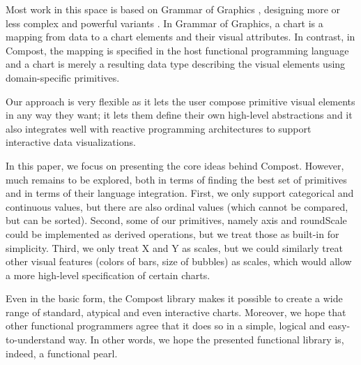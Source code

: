 \documentclass{jfp}
\newcommand{\kvd}[1]{\textnormal{\textcolor{kvdclr}{\sffamily #1}}}
\begin{document}
Most work in this space is based on Grammar of Graphics \cite{grammar}, designing more or less complex and
powerful variants \cite{layered,vega-lite,vega,polaris}. In Grammar of Graphics, a chart is a mapping from
data to a chart elements and their visual attributes. In contrast, in Compost, the mapping is
specified in the host functional programming language and a chart is merely a resulting data type
describing the visual elements using domain-specific primitives.

Our approach is very flexible as it lets the user compose primitive visual elements in any
way they want; it lets them define their own high-level abstractions and it also integrates well
with reactive programming architectures to support interactive data visualizations.

In this paper, we focus on presenting the core ideas behind Compost. However, much
remains to be explored, both in terms of finding the best set of primitives and in terms of
their language integration. First, we only support categorical and continuous values, but
there are also ordinal values (which cannot be compared, but can be sorted). Second, some of our
primitives, namely \kvd{axis} and \kvd{roundScale} could be implemented as derived operations, but
we treat those as built-in for simplicity. Third, we only treat X and Y as scales, but we could
similarly treat other visual features (colors of bars, size of bubbles) as scales, which would
allow a more high-level specification of certain charts.

Even in the basic form, the Compost library makes it possible to
create a wide range of standard, atypical and even interactive charts. Moreover, we hope that
other functional programmers agree that it does so in a simple, logical and easy-to-understand way.
In other words, we hope the presented functional library is, indeed, a functional pearl.



\end{document}
